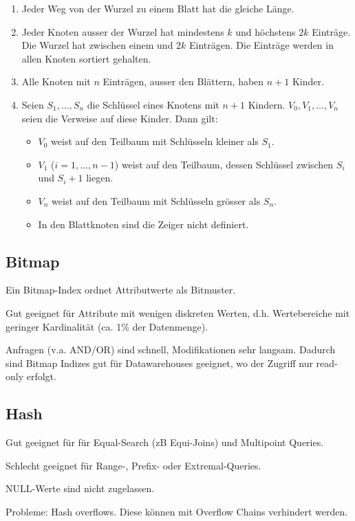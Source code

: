 \begin{enumerate}
	\item Jeder Weg von der Wurzel zu einem Blatt hat die gleiche Länge.
	\item Jeder Knoten ausser der Wurzel hat mindestens $k$ und höchstens $2k$
		Einträge. Die Wurzel hat zwischen einem und $2k$ Einträgen. Die Einträge
		werden in allen Knoten sortiert gehalten.
	\item Alle Knoten mit $n$ Einträgen, ausser den Blättern, haben $n+1$ Kinder.
	\item Seien $S_1, \ldots, S_n$ die Schlüssel eines Knotens mit $n+1$ Kindern.
		$V_0, V_1, \ldots, V_n$ seien die Verweise auf diese Kinder. Dann gilt:
		\begin{itemize}
			\item $V_0$ weist auf den Teilbaum mit Schlüsseln kleiner als $S_1$.
			\item $V_1$ ($i=1, \ldots, n-1$) weist auf den Teilbaum, dessen Schlüssel
				zwischen $S_i$ und $S_i+1$ liegen.
			\item $V_n$ weist auf den Teilbaum mit Schlüsseln grösser als $S_n$.
			\item In den Blattknoten sind die Zeiger nicht definiert.
		\end{itemize}
\end{enumerate}


\subsection{Bitmap}

Ein Bitmap-Index ordnet Attributwerte als Bitmuster.

Gut geeignet für Attribute mit wenigen diskreten Werten, d.h. Wertebereiche mit
geringer Kardinalität (ca. 1\% der Datenmenge).

Anfragen (v.a. AND/OR) sind schnell, Modifikationen sehr langsam. Dadurch sind
Bitmap Indizes gut für Datawarehouses geeignet, wo der Zugriff nur read-only
erfolgt.


\subsection{Hash}

Gut geeignet für für Equal-Search (zB Equi-Joins) und Multipoint Queries.

Schlecht geeignet für Range-, Prefix- oder Extremal-Queries.

NULL-Werte sind nicht zugelassen.

Probleme: Hash overflows. Diese können mit Overflow Chains verhindert werden.
